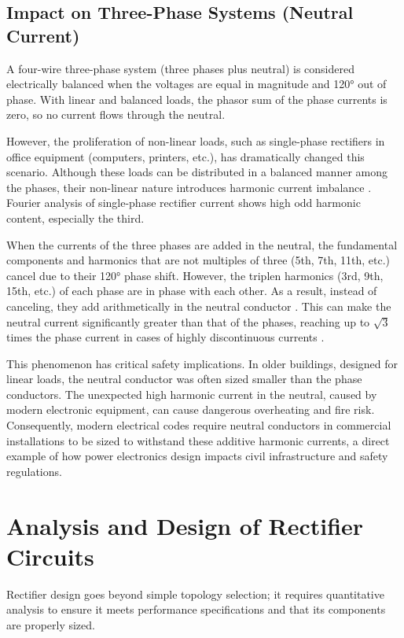 \documentclass[12pt,a4paper]{article}
\begin{document}
\subsection{Impact on Three-Phase Systems (Neutral Current)}

A four-wire three-phase system (three phases plus neutral) is considered electrically balanced when the voltages are equal in magnitude and 120° out of phase. With linear and balanced loads, the phasor sum of the phase currents is zero, so no current flows through the neutral.

However, the proliferation of non-linear loads, such as single-phase rectifiers in office equipment (computers, printers, etc.), has dramatically changed this scenario. Although these loads can be distributed in a balanced manner among the phases, their non-linear nature introduces harmonic current imbalance \cite{mohan2003}. Fourier analysis of single-phase rectifier current shows high odd harmonic content, especially the third.

When the currents of the three phases are added in the neutral, the fundamental components and harmonics that are not multiples of three (5th, 7th, 11th, etc.) cancel due to their 120° phase shift. However, the triplen harmonics (3rd, 9th, 15th, etc.) of each phase are in phase with each other. As a result, instead of canceling, they add arithmetically in the neutral conductor \cite{mohan2003}. This can make the neutral current significantly greater than that of the phases, reaching up to $\sqrt{3}$ times the phase current in cases of highly discontinuous currents \cite{mohan2003}.

This phenomenon has critical safety implications. In older buildings, designed for linear loads, the neutral conductor was often sized smaller than the phase conductors. The unexpected high harmonic current in the neutral, caused by modern electronic equipment, can cause dangerous overheating and fire risk. Consequently, modern electrical codes require neutral conductors in commercial installations to be sized to withstand these additive harmonic currents, a direct example of how power electronics design impacts civil infrastructure and safety regulations.

\section{Analysis and Design of Rectifier Circuits}

Rectifier design goes beyond simple topology selection; it requires quantitative analysis to ensure it meets performance specifications and that its components are properly sized.
\end{document}
